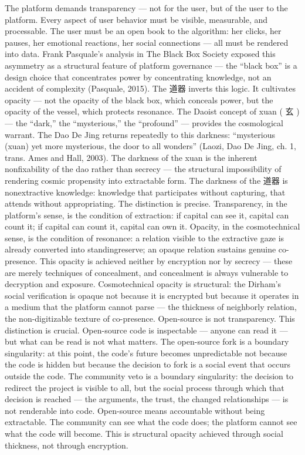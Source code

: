 The platform demands transparency — not for the user, but of the user to the platform. Every aspect of user behavior must be visible, measurable, and processable. The user must be an open book to the algorithm: her clicks, her pauses, her emotional reactions, her social connections — all must be rendered into data. Frank Pasquale’s analysis in The Black Box Society exposed this asymmetry as a structural feature of platform governance — the “black box” is a design choice that concentrates power by concentrating knowledge, not an accident of complexity (Pasquale, 2015). The 道器 inverts this logic. It cultivates opacity — not the opacity of the black box, which conceals power, but the opacity of the vessel, which protects resonance. The Daoist concept of xuan ( 玄 ) — the “dark,” the “mysterious,” the “profound” — provides the cosmological warrant. The Dao De Jing returns repeatedly to this darkness: “mysterious (xuan) yet more mysterious, the door to all wonders” (Laozi, Dao De Jing, ch. 1, trans. Ames and Hall, 2003). The darkness of the xuan is the inherent nonfixability of the dao rather than secrecy — the structural impossibility of rendering cosmic propensity into extractable form. The darkness of the 道器 is nonextractive knowledge: knowledge that participates without capturing, that attends without appropriating. The distinction is precise. Transparency, in the platform’s sense, is the condition of extraction: if capital can see it, capital can count it; if capital can count it, capital can own it. Opacity, in the cosmotechnical sense, is the condition of resonance: a relation visible to the extractive gaze is already converted into standingreserve; an opaque relation sustains genuine co-presence. This opacity is achieved neither by encryption nor by secrecy — these are merely techniques of concealment, and concealment is always vulnerable to decryption and exposure. Cosmotechnical opacity is structural: the Dirham’s social verification is opaque not because it is encrypted but because it operates in a medium that the platform cannot parse — the thickness of neighborly relation, the non-digitizable texture of co-presence. Open-source is not transparency. This distinction is crucial. Open-source code is inspectable — anyone can read it — but what can be read is not what matters. The open-source fork is a boundary singularity: at this point, the code’s future becomes unpredictable not because the code is hidden but because the decision to fork is a social event that occurs outside the code. The community veto is a boundary singularity: the decision to redirect the project is visible to all, but the social process through which that decision is reached — the arguments, the trust, the changed relationships — is not renderable into code. Open-source means accountable without being extractable. The community can see what the code does; the platform cannot see what the code will become. This is structural opacity achieved through social thickness, not through encryption.

